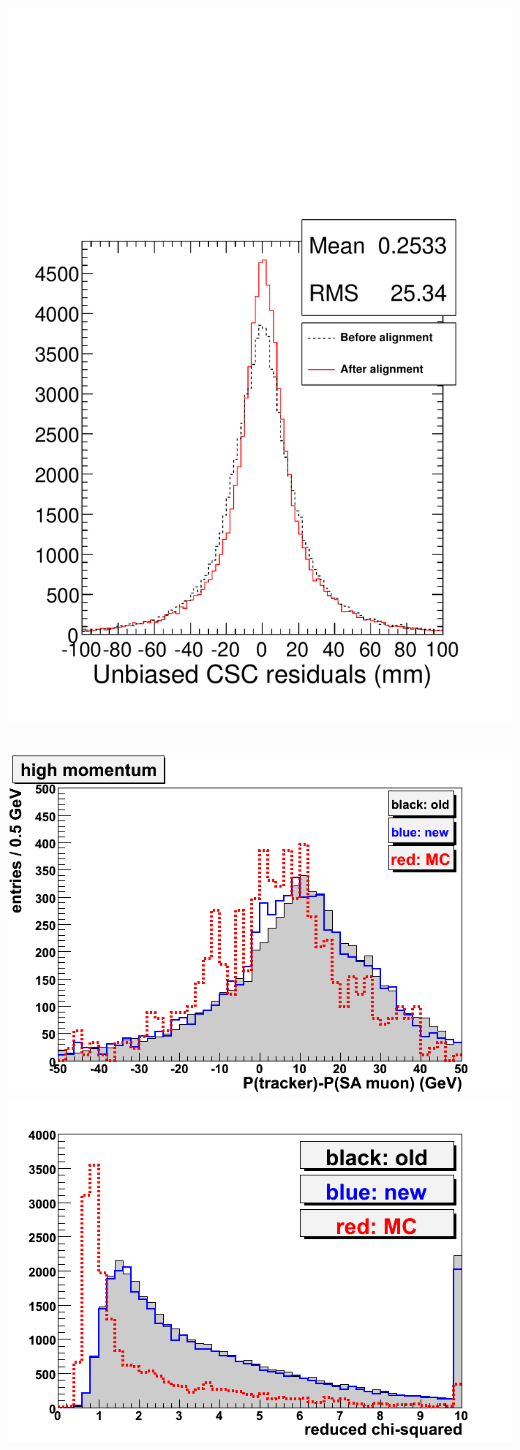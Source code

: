 \documentclass[compress]{beamer}
\begin{document}
\begin{frame}
\begin{columns}
\includegraphics[width=\linewidth]{endcap_residuals.pdf}
\end{columns}

\vfill
\includegraphics[width=0.5\linewidth]{csc_p_comparison.png}
\includegraphics[width=0.5\linewidth]{csc_chi2_comparison.png}
\end{frame}
\end{document}
